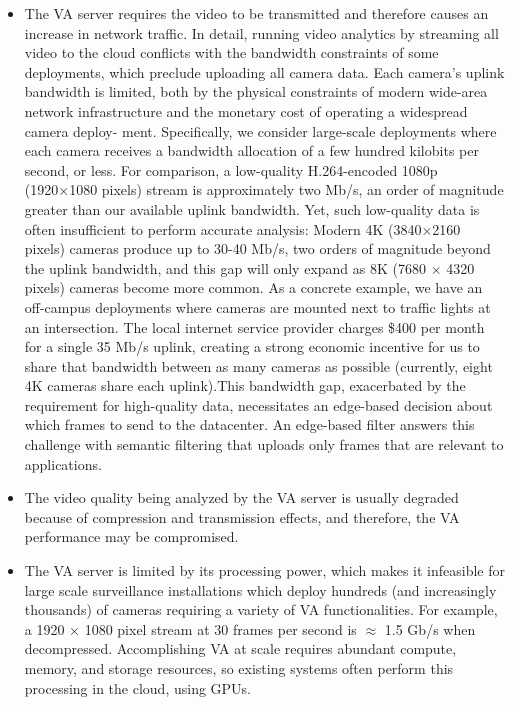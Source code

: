 \begin{itemize}
\item The VA server requires the video to be transmitted and therefore causes an increase in network traffic. In detail, running video analytics by streaming all video to the cloud conflicts with the bandwidth constraints of some deployments, which preclude uploading all camera data. Each camera’s uplink bandwidth is limited, both by the physical constraints of modern wide-area network infrastructure and the monetary cost of operating a widespread camera deploy-
ment. Specifically, we consider large-scale deployments where each camera receives a bandwidth allocation of a few hundred kilobits per second, or less. For comparison, a low-quality H.264-encoded 1080p (1920×1080 pixels) stream is approximately two Mb/s, an order of magnitude greater than our available uplink bandwidth. Yet, such low-quality data is often insufficient to perform accurate analysis: Modern 4K (3840×2160 pixels) cameras produce up to 30-40 Mb/s, two
orders of magnitude beyond the uplink bandwidth, and this
gap will only expand as 8K (7680 × 4320 pixels) cameras become more common. As a concrete example, we have an off-campus deployments where cameras are mounted next
to traffic lights at an intersection. The local internet service provider charges \$400 per month for a single 35 Mb/s uplink, creating a strong economic incentive for us to share that bandwidth between as many cameras as possible (currently,
eight 4K cameras share each uplink).This bandwidth gap, exacerbated by the requirement for high-quality data, necessitates an edge-based decision about
which frames to send to the datacenter. An edge-based filter answers this challenge with semantic filtering that uploads only frames that are relevant to applications.
\item The video quality being analyzed by the VA server is usually degraded because of compression and transmission effects, and therefore, the VA performance may be compromised.
\item The VA server is limited by its processing power, which makes it infeasible for large scale surveillance installations which deploy hundreds (and increasingly thousands) of cameras requiring a variety of VA functionalities. For example, a 1920 × 1080 pixel stream at 30 frames per second is $\approx$ 1.5 Gb/s when decompressed. Accomplishing VA at scale requires abundant compute, memory, and storage resources, so existing systems often perform this processing in the cloud, using GPUs.
\end{itemize}
